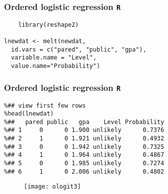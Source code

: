 \documentclass[00-GLMregslides.tex]{subfiles}
\begin{document}
\begin{frame}[fragile]
\frametitle{Ordered logistic regression \texttt{R} }
\normalsize
\large
\begin{framed}
	\begin{verbatim}
	library(reshape2)
	
lnewdat <- melt(newdat, 
  id.vars = c("pared", "public", "gpa"),
  variable.name = "Level", 
  value.name="Probability")
\end{verbatim}
\end{framed}
\end{frame}
\begin{frame}[fragile]
	\frametitle{Ordered logistic regression \texttt{R} }
	\large
	\begin{framed}
		\begin{verbatim}
%## view first few rows
%head(lnewdat)
%##   pared public   gpa    Level Probability
%## 1     0      0 1.900 unlikely      0.7376
%## 2     1      0 1.921 unlikely      0.4932
%## 3     0      0 1.942 unlikely      0.7325
%## 4     1      0 1.964 unlikely      0.4867
%## 5     0      0 1.985 unlikely      0.7274
%## 6     1      0 2.006 unlikely      0.4802
\end{verbatim}
\end{framed}
\end{frame}
%    
\begin{frame}

\begin{figure}
\centering
\texttt{[image: ologit3]}
\end{figure}
	
\end{frame}
\end{document}
